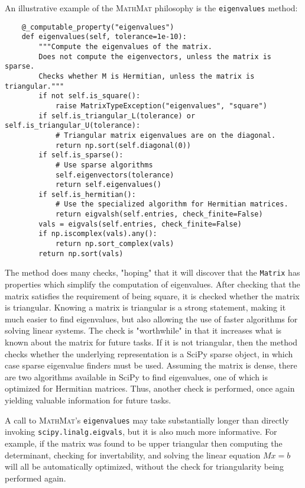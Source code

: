 \documentclass[12pt,a4paper]{article}
\newcommand{\mathmat}{\textsc{MathMat} }
\newcommand{\ct}[1]{\texttt{#1}}
\begin{document}
An illustrative example of the \mathmat philosophy is the \ct{eigenvalues} method:
\begin{verbatim}
    @_computable_property("eigenvalues")
    def eigenvalues(self, tolerance=1e-10):
        """Compute the eigenvalues of the matrix.
        Does not compute the eigenvectors, unless the matrix is sparse.
        Checks whether M is Hermitian, unless the matrix is triangular."""
        if not self.is_square():
            raise MatrixTypeException("eigenvalues", "square")
        if self.is_triangular_L(tolerance) or self.is_triangular_U(tolerance):
            # Triangular matrix eigenvalues are on the diagonal.
            return np.sort(self.diagonal(0))
        if self.is_sparse():
            # Use sparse algorithms
            self.eigenvectors(tolerance)
            return self.eigenvalues()
        if self.is_hermitian():
            # Use the specialized algorithm for Hermitian matrices.
            return eigvalsh(self.entries, check_finite=False)
        vals = eigvals(self.entries, check_finite=False)
        if np.iscomplex(vals).any():
            return np.sort_complex(vals)
        return np.sort(vals)
\end{verbatim}

The method does many checks, "hoping" that it will discover that the \ct{Matrix} has properties which simplify the computation of eigenvalues. After checking that the matrix satisfies the requirement of being square, it is checked whether the matrix is triangular. Knowing a matrix is triangular is a strong statement, making it much easier to find eigenvalues, but also allowing the use of faster algorithms for solving linear systems. The check is "worthwhile" in that it increases what is known about the matrix for future tasks. If it is not triangular, then the method checks whether the underlying representation is a SciPy sparse object, in which case sparse eigenvalue finders must be used. Assuming the matrix is dense, there are two algorithms available in SciPy to find eigenvalues, one of which is optimized for Hermitian matrices. Thus, another check is performed, once again yielding valuable information for future tasks. 

A call to \textsc{MathMat}'s \ct{eigenvalues} may take substantially longer than directly invoking  \ct{scipy.linalg.eigvals}, but it is also much more informative. For example, if the matrix was found to be upper triangular then computing the determinant, checking for invertability, and solving the linear equation $Mx = b$ will all be automatically optimized, without the check for triangularity being performed again.
\end{document}
